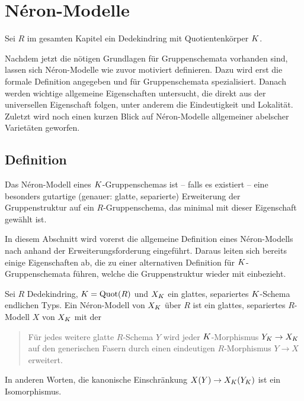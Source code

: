 \chapter{Néron-Modelle}\label{chap:neronmodelle}
Sei $R$ im gesamten Kapitel ein Dedekindring mit Quotientenkörper
$K$.

Nachdem jetzt die nötigen Grundlagen für Gruppenschemata vorhanden
sind, lassen sich Néron-Modelle wie zuvor motiviert definieren.
Dazu wird erst die formale Definition angegeben und für
Gruppenschemata spezialisiert. Danach werden wichtige allgemeine
Eigenschaften untersucht, die direkt aus der universellen Eigenschaft
folgen, unter anderem die Eindeutigkeit und Lokalität.
Zuletzt wird noch einen kurzen Blick auf Néron-Modelle
allgemeiner abelscher Varietäten geworfen.

\section{Definition}
Das Néron-Modell eines $K$-Gruppenschemas ist – falls es existiert –
eine besonders gutartige (genauer: glatte, separierte) Erweiterung der
Gruppenstruktur auf ein $R$-Gruppenschema, das
minimal mit dieser Eigenschaft gewählt ist.

In diesem Abschnitt wird vorerst die allgemeine Definition eines
Néron-Modells nach \cite[1.2, Definition 1]{neron} anhand der
Erweiterungsforderung eingeführt. Daraus leiten sich bereits einige
Eigenschaften ab, die zu einer alternativen Definition für
$K$-Gruppenschemata führen, welche die Gruppenstruktur wieder mit
einbezieht.

\begin{Definition}
  Sei $R$ Dedekindring, $K=\operatorname{Quot}(R)$ und
  $X_{K}$ ein glattes, separiertes $K$-Schema endlichen Typs.
  Ein Néron-Modell von $X_{K}$ über $R$ ist ein glattes, separiertes
  $R$-Modell $X$ von $X_{K}$ mit der \NAbbEig
  \begin{quote}
    Für jedes weitere glatte $R$-Schema $Y$ wird jeder
    $K$-Morphismus $Y_{K}\to X_{K}$ auf den generischen Fasern durch
    einen eindeutigen $R$-Morphismus $Y\to X$ erweitert.
  \end{quote}
  In anderen Worten, die kanonische Einschränkung $X(Y)\to
  X_{K}(Y_{K})$ ist ein Isomorphismus.
\end{Definition}

